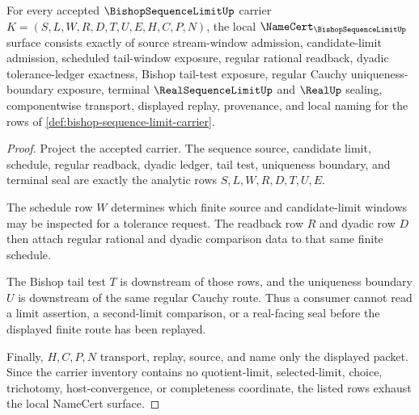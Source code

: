 \begin{theorem}
\label{thm:bishop-sequence-limit-namecert-obligations}
For every accepted $\BishopSequenceLimitUp$ carrier $K=(S,L,W,R,D,T,U,E,H,C,P,N)$, the local $\NameCert_{\BishopSequenceLimitUp}$ surface consists exactly of source stream-window admission, candidate-limit admission, scheduled tail-window exposure, regular rational readback, dyadic tolerance-ledger exactness, Bishop tail-test exposure, regular Cauchy uniqueness-boundary exposure, terminal $\RealSequenceLimitUp$ and $\RealUp$ sealing, componentwise transport, displayed replay, provenance, and local naming for the rows of \autoref{def:bishop-sequence-limit-carrier}.
\end{theorem}
\begin{proof}
Project the accepted carrier. The sequence source, candidate limit, schedule, regular readback, dyadic ledger, tail test, uniqueness boundary, and terminal seal are exactly the analytic rows $S,L,W,R,D,T,U,E$.

The schedule row $W$ determines which finite source and candidate-limit windows may be inspected for a tolerance request. The readback row $R$ and dyadic row $D$ then attach regular rational and dyadic comparison data to that same finite schedule.

The Bishop tail test $T$ is downstream of those rows, and the uniqueness boundary $U$ is downstream of the same regular Cauchy route. Thus a consumer cannot read a limit assertion, a second-limit comparison, or a real-facing seal before the displayed finite route has been replayed.

Finally, $H,C,P,N$ transport, replay, source, and name only the displayed packet. Since the carrier inventory contains no quotient-limit, selected-limit, choice, trichotomy, host-convergence, or completeness coordinate, the listed rows exhaust the local NameCert surface.
\end{proof}

